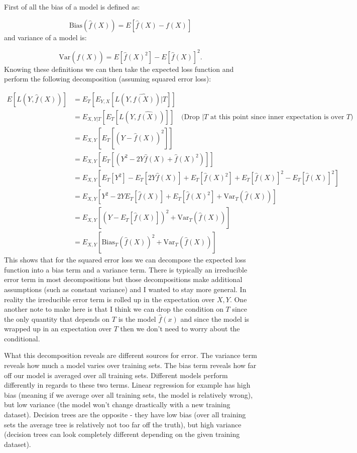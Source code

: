 First of all the bias of a model is defined as:

\begin{equation}
\text{Bias}\left(\hat{f}(X)\right) = E \left[\hat{f}(X) - f(X)\right]
\end{equation}
and variance of a model is:

\begin{equation}
\text{Var}\left(\hat{f}(X)\right) = E \left[\hat{f}(X)^2\right] - E \left[\hat{f}(X)\right]^2. 
\end{equation}
Knowing these definitions we can then take the expected loss function and perform the following decomposition (assuming squared error loss):

\begin{equation}
\begin{split}
E[L(Y, \hat{f}(X))] & = E_{T}[E_{Y,X}[L(Y, \hat{f(X)})|T]] \\
&= E_{X,Y|T}[E_{T}[L(Y, \hat{f(X)})]]  \quad \text{(Drop $|T$ at this point since inner expectation is over $T$)}\\
&= E_{X,Y}[E_{T}[(Y - \hat{f}(X))^2]] \\
&= E_{X,Y}[E_{T}[(Y^2 - 2Y\hat{f}(X) + \hat{f}(X)^2)]] \\
&= E_{X,Y}[E_{T}[Y^2] - E_{T}[2Y\hat{f}(X)] + E_{T}[\hat{f}(X)^2] + E_{T}[\hat{f}(X)]^2 - E_{T}[\hat{f}(X)]^2]\\
&= E_{X,Y}[Y^2 -  2YE_{T}[\hat{f}(X)] + E_{T}[\hat{f}(X)^2] + \text{Var}_{T}(\hat{f}(X))]\\
&=E_{X,Y}[(Y - E_{T}[\hat{f}(X)])^2 + \text{Var}_{T}(\hat{f}(X))] \\
&= E_{X,Y}[\text{Bias}_{T}(\hat{f}(X))^2 + \text{Var}_{T}(\hat{f}(X))] 
\end{split}
\end{equation}
This shows that for the squared error loss we can decompose the expected loss function into a bias term and a variance term. There is typically an irreducible error term in most decompositions but those decompositions make additional assumptions (such as constant variance) and I wanted to stay more general. In reality the irreducible error term is rolled up in the expectation over $X,Y$. One another note to make here is that I think we can drop the condition on $T$ since the only quantity that depends on $T$ is the model $\hat{f}(x)$ and since the model is wrapped up in an expectation over $T$ then we don't need to worry about the conditional.

What this decomposition reveals are different sources for error. The variance term reveals how much a model varies over training sets. The bias term reveals how far off our model is averaged over all training sets. Different models perform differently in regards to these two terms. Linear regression for example has high bias (meaning if we average over all training sets, the model is relatively wrong), but low variance (the model won't change drastically with a new training dataset). Decision trees are the opposite - they have low bias (over all training sets the average tree is relatively not too far off the truth), but high variance (decision trees can look completely different depending on the given training dataset).

